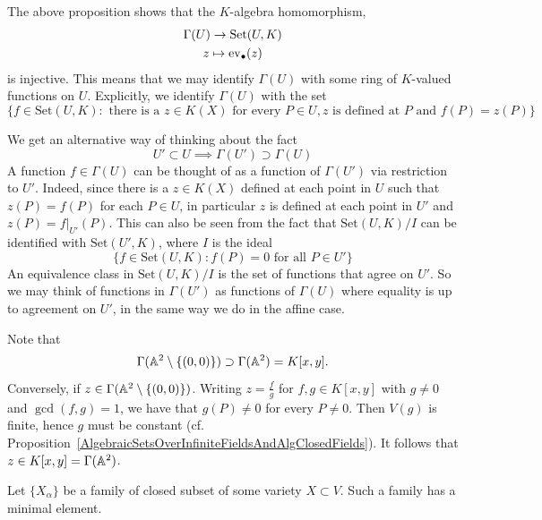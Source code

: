     \begin{remark}
        The above proposition shows that the $K$-algebra homomorphism, 
        \begin{gather*}
            \Gamma(U) \rightarrow \mathrm{Set}(U,K)\\
            z \mapsto \mathrm{ev}_\bullet(z)
        \end{gather*}
        is injective. This means that we may identify $\Gamma(U)$ with some ring of $K$-valued functions on $U$. Explicitly, we identify $\Gamma(U)$ with the set
        $$
            \Big\{ f\in \mathrm{Set}(U,K) : \text{ there is a } z\in K(X) \text{ for every } P \in U, z  \text{ is defined at } P \text{ and } f(P)=z(P) \Big\} 
        $$
    \end{remark}
    \begin{remark}
        We get an alternative way of thinking about the fact 
        $$
            U'\subset U\implies \Gamma(U')\supset \Gamma(U)
        $$
        A function $f\in \Gamma(U)$ can be thought of as a function of $\Gamma(U')$ via restriction to $U'$. Indeed, since there is a $z\in K(X)$ defined at each point in $U$ such that $z(P)=f(P)$ for each $P\in U$, in particular $z$ is defined at each point in $U'$ and $z(P) = \left. f\right|_{U'}(P)$. This can also be seen from the fact that $\mathrm{Set}(U,K)/I$  can be identified with $\mathrm{Set}(U',K)$, where $I$ is the ideal 
        $$
            \{f \in \mathrm{Set}(U,K): f(P)=0 \text{ for all } P\in U'\}
        $$
        An equivalence class in $\mathrm{Set}(U,K)/I$ is the set of functions that agree on $U'$. So we may think of functions in $\Gamma(U')$ as functions of $\Gamma(U)$ where equality is up to agreement on $U'$, in the same way we do in the affine case. 
    \end{remark}
    \begin{example}\label{RationalFunctionsOnAffinePlaneWithoutAPointIsTheSameAsRationalFunctionsOnAffinePlane}
        Note that 
        $$
            \Gamma(\mathbb{A}^2\setminus \{(0,0)\})\supset \Gamma(\mathbb{A}^2)=K[x,y].
        $$ 
        Conversely, if $z \in \Gamma(\mathbb{A}^2\setminus \{(0,0)\})$. Writing $z= \frac{f}{g}$ for $f,g\in K[x,y]$ with $g\neq 0$ and $\gcd(f,g)=1$, we have that $g(P)\neq 0$ for every $P\neq 0$. Then $V(g)$ is finite, hence $g$ must be constant (cf. Proposition~\ref{AlgebraicSetsOverInfiniteFieldsAndAlgClosedFields}). It follows that $z\in K[x,y]=\Gamma(\mathbb{A}^2)$.
    \end{example}
    \begin{proposition}
        Let $\{X_\alpha\}$ be a family of closed subset of some variety $X\subset V$. Such a family has a minimal element.
    \end{proposition}
